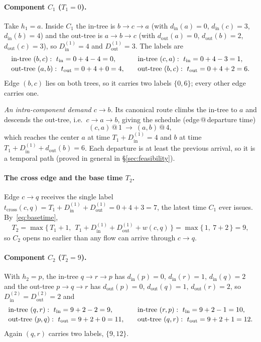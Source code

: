 \documentclass[11pt]{article}
\theoremstyle{definition}
\theoremstyle{remark}
\newcommand{\din}{d_{\mathrm{in}}}
\newcommand{\dout}{d_{\mathrm{out}}}
\begin{document}
\paragraph{Component $C_1$ ($T_1=0$).} Take $h_1=a$. Inside $C_1$ the in-tree is $b\to c\to a$ (with
$\din(a)=0$, $\din(c)=3$, $\din(b)=4$) and the out-tree is $a\to b\to c$ (with $\dout(a)=0$,
$\dout(b)=2$, $\dout(c)=3$), so $D^{(1)}_{\mathrm{in}}=4$ and $D^{(1)}_{\mathrm{out}}=3$. The labels are
\[
  \begin{array}{l@{\qquad}l}
    \text{in-tree }(b,c):\ t_{\mathrm{in}}=0+4-4=0,  & \text{in-tree }(c,a):\ t_{\mathrm{in}}=0+4-3=1,\\[2pt]
    \text{out-tree }(a,b):\ t_{\mathrm{out}}=0+4+0=4, & \text{out-tree }(b,c):\ t_{\mathrm{out}}=0+4+2=6.
  \end{array}
\]
Edge $(b,c)$ lies on both trees, so it carries two labels $\{0,6\}$; every other edge carries one.

\emph{An intra-component demand $c\to b$.} Its canonical route climbs the in-tree to $a$ and descends
the out-tree, i.e.\ $c\to a\to b$, giving the schedule (edge\,@\,departure time)
\[
  (c,a)\,@\,1\ \longrightarrow\ (a,b)\,@\,4,
\]
which reaches the center $a$ at time $T_1+D^{(1)}_{\mathrm{in}}=4$ and $b$ at time
$T_1+D^{(1)}_{\mathrm{in}}+\dout(b)=6$. Each departure is at least the previous arrival, so it is a
temporal path (proved in general in \S\ref{sec:feasibility}).

\paragraph{The cross edge and the base time $T_2$.} Edge $c\to q$ receives the single label
$t_{\mathrm{cross}}(c,q)=T_1+D^{(1)}_{\mathrm{in}}+D^{(1)}_{\mathrm{out}}=0+4+3=7$, the latest time
$C_1$ ever issues. By~\eqref{eq:basetime},
\[
  T_2=\max\bigl\{\,T_1+1,\ \ T_1+D^{(1)}_{\mathrm{in}}+D^{(1)}_{\mathrm{out}}+w(c,q)\,\bigr\}
     =\max\{\,1,\ 7+2\,\}=9,
\]
so $C_2$ opens no earlier than any flow can arrive through $c\to q$.

\paragraph{Component $C_2$ ($T_2=9$).} With $h_2=p$, the in-tree $q\to r\to p$ has $\din(p)=0$,
$\din(r)=1$, $\din(q)=2$ and the out-tree $p\to q\to r$ has $\dout(p)=0$, $\dout(q)=1$, $\dout(r)=2$,
so $D^{(2)}_{\mathrm{in}}=D^{(2)}_{\mathrm{out}}=2$ and
\[
  \begin{array}{l@{\qquad}l}
    \text{in-tree }(q,r):\ t_{\mathrm{in}}=9+2-2=9,   & \text{in-tree }(r,p):\ t_{\mathrm{in}}=9+2-1=10,\\[2pt]
    \text{out-tree }(p,q):\ t_{\mathrm{out}}=9+2+0=11, & \text{out-tree }(q,r):\ t_{\mathrm{out}}=9+2+1=12.
  \end{array}
\]
Again $(q,r)$ carries two labels, $\{9,12\}$.
\end{document}
